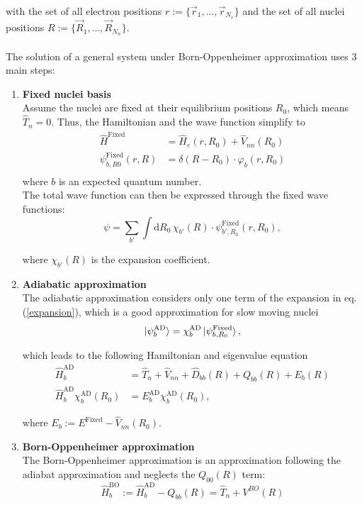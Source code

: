 \documentclass{article}
\newcommand{\diff}{\mathrm{d}}
\begin{document}
with the set of all electron positions $r := \{\vec{r}_1, ..., \vec{r}_{N_e}\}$ and the set of all nuclei positions $R := \{\vec{R}_1, ..., \vec{R}_{N_n}\}$.\\
\\
The solution of a general system under Born-Oppenheimer approximation uses 3 main steps:
	\begin{enumerate}
		\item \textbf{Fixed nuclei basis}\\
		Assume the nuclei are fixed at their equilibrium positions $R_0$, which means $\hat{T}_n = 0$. Thus, the Hamiltonian and the wave function simplify to
			\begin{align}
				\hat{H}^\text{Fixed} &= \hat{H}_e(r,R_0) + \hat{V}_{nn}(R_0) \\
				\psi_{b,R0}^\text{Fixed}(r,R) &= \delta(R - R_0) \cdot \varphi_b(r,R_0) \\
			\end{align}
		where $b$ is an expected quantum number.\\
		The total wave function can then be expressed through the fixed wave functions:
			\begin{equation}
				\label{expansion}
				\psi = \sum_{b'} \int \diff R_0 \, \chi_{b'}(R) \cdot \psi_{b',R_0}^\text{Fixed}(r,R_0),
			\end{equation}
		
		where $\chi_{b'}(R)$ is the expansion coefficient.


		\item \textbf{Adiabatic approximation}\\
		The adiabatic approximation considers only one term of the expansion in eq. (\ref{expansion}), which is a good approximation for slow moving nuclei
			\begin{equation}
				\ket{\psi^\text{AD}_{b}} = \chi_{b}^\text{AD} \ket{\psi_{b,R_0}^\text{Fixed}},
			\end{equation}
		
		which leads to the following Hamiltonian and eigenvalue equation
			\begin{align}
				\hat{H}_b^\text{AD} &= \hat{T}_n + \hat{V}_{nn} + \hat{D}_{bb}(R) + Q_{bb}(R) + E_b(R) \\
				\hat{H}_b^\text{AD} \chi_b^\text{AD}(R_0) &= E_b^\text{AD} \chi_b^\text{AD}(R_0),
			\end{align}
		
		where $E_b := E^\text{Fixed} - \hat{V}_{nn}(R_0)$.

		
		\item \textbf{Born-Oppenheimer approximation}\\
		The Born-Oppenheimer approximation is an approximation following the adiabat approximation and neglects the $Q_{00}(R)$ term:
			\begin{equation}
				\hat{H}_b^\text{BO} := \hat{H}_b^\text{AD} - Q_{bb}(R) = \hat{T}_n + V^{BO}(R)
			\end{equation}
	\end{enumerate}
\end{document}
